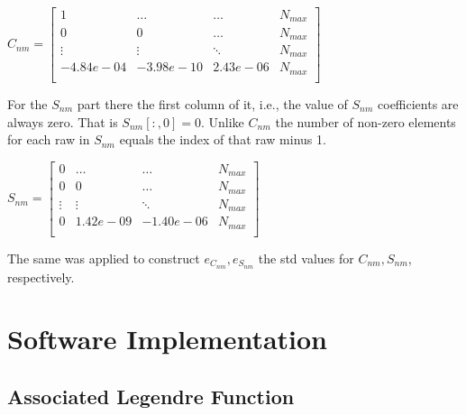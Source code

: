 	\(
	C_{nm} = \begin{bmatrix}
		1 & \ldots & \ldots& N_{max}\\
		0 & 0 & \dots & N_{max}\\
		\vdots &\vdots &\ddots & N_{max}\\
		-4.84e-04 & -3.98e-10 & 2.43e-06 & N_{max}\\

	\end{bmatrix}
	\)
	
	For the $S_{nm}$ part there the first column of it, i.e., the value of $S_{nm}$ coefficients are always zero. That is $S_{nm}[:, 0] = 0$. Unlike $C_{nm}$ the number of non-zero elements for each raw in $S_{nm}$ equals the index of that raw minus 1.
	
	\(
		S_{nm} = \begin{bmatrix}
		0 & \ldots &\ldots & N_{max}\\
		0 & 0 & \dots & N_{max}\\
		\vdots &\vdots &\ddots & N_{max}\\
		0 &  1.42e-09& -1.40e-06 & N_{max}\\
		
		\end{bmatrix}
	\)
	

	The same was applied to construct $e_{C_{nm}}, e_{S_{nm}}$ the std values for $C_{nm}, S_{nm}$, respectively.


\section{Software Implementation}
\subsection{Associated Legendre Function}

